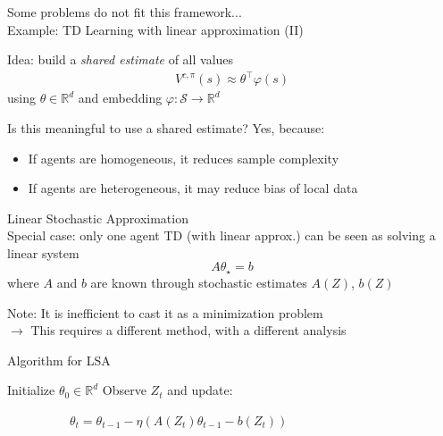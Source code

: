 \documentclass[aspectratio=169,14pt]{beamer}
\begin{document}
\begin{frame}{Some problems do not fit this framework...\\[-0.5em]
    \large Example: TD Learning with linear approximation (II)}

  Idea: build a \emph{shared estimate} of all values
  \begin{align*}
    V^{c,\pi}(s) \approx \theta^\top \varphi(s)
  \end{align*}
  using $\theta \in \mathbb{R}^d$ and embedding $\varphi: \mathcal{S} \rightarrow \mathbb{R}^d$

  \vspace{1em}
  
  \pause

  Is this meaningful to use a shared estimate? Yes, because:
  \begin{itemize}
  \item If agents are homogeneous, it reduces sample complexity
  \item If agents are heterogeneous, it may reduce bias of local data
  \end{itemize}
\end{frame}


\begin{frame}{Linear Stochastic Approximation\\[-0.5em]
  \normalsize Special case: only one agent}
  TD (with linear approx.) can be seen as solving a linear system 
  \begin{equation*}
    A \theta_\star
    = 
    b
  \end{equation*}
  where $A$ and $b$ are known through stochastic estimates $A(Z)$, $b(Z)$

  \vspace{2em}

  \pause
  
  Note: It is inefficient to cast it as a minimization problem\\
  $\rightarrow$ This requires a different method, with a different analysis
\end{frame}

\begin{frame}{Algorithm for LSA}
  \begin{algorithmic}
    \State Initialize $\theta_0 \in \mathbb{R}^d$
    \State Observe $Z_{t}$ and update:
    \begin{center}
      ~~~~~~~~~~$\theta_{t} = \theta_{t-1} - \eta( A(Z_{t}) \theta_{t-1} - b(Z_{t}))$
    \end{center}
    \EndFor
  \end{algorithmic}  
  
\end{frame}
\end{document}
